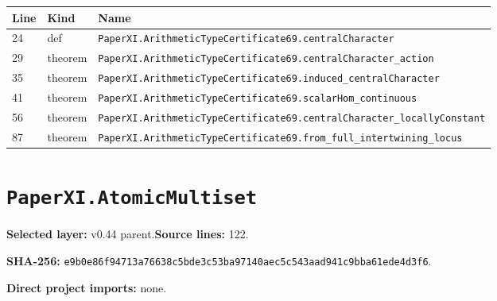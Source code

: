 \documentclass[10pt,oneside]{book}
\begin{document}
\begin{longtable}{@{}p{}p{}p{}@{}}\toprule Line&Kind&Name\\\midrule\endhead

24&def&\nolinkurl{PaperXI.ArithmeticTypeCertificate69.centralCharacter}\\

29&theorem&\nolinkurl{PaperXI.ArithmeticTypeCertificate69.centralCharacter_action}\\

35&theorem&\nolinkurl{PaperXI.ArithmeticTypeCertificate69.induced_centralCharacter}\\

41&theorem&\nolinkurl{PaperXI.ArithmeticTypeCertificate69.scalarHom_continuous}\\

56&theorem&\nolinkurl{PaperXI.ArithmeticTypeCertificate69.centralCharacter_locallyConstant}\\

87&theorem&\nolinkurl{PaperXI.ArithmeticTypeCertificate69.from_full_intertwining_locus}\\

\bottomrule\end{longtable}

\section{\texorpdfstring{\nolinkurl{PaperXI.AtomicMultiset}}{PaperXI.AtomicMultiset}}\label{module:PaperXI.AtomicMultiset}

\textbf{Selected layer:} v0.44 parent.\quad\textbf{Source lines:} 122.\par\textbf{SHA-256:} {\scriptsize\nolinkurl{e9b0e86f94713a76638c5bde3c53ba97140aec5c543aad941c9bba61ede4d3f6}}.


\textbf{Direct project imports:} none.
\end{document}
